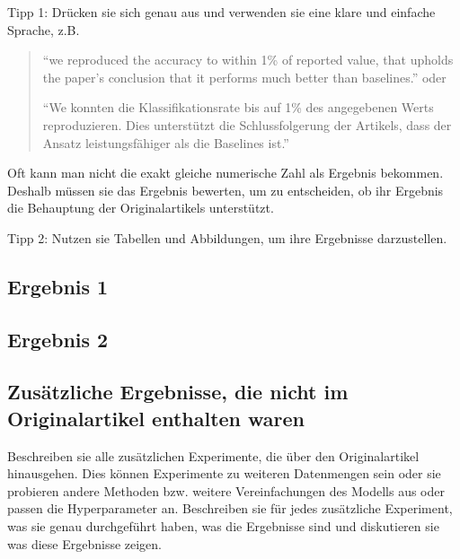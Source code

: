 \documentclass[DIV=13,fontsize=11pt]{scrartcl}
\begin{document}

Tipp 1: Drücken sie sich genau aus und verwenden sie eine klare und einfache Sprache, z.B. 
\begin{quote}
    ``we reproduced the accuracy to within 1\% of reported value, that upholds the paper's conclusion that it performs much better than baselines.'' oder

    ``We konnten die Klassifikationsrate bis auf 1\% des angegebenen Werts reproduzieren. Dies unterstützt die Schlussfolgerung der Artikels, dass der Ansatz leistungsfähiger als die Baselines ist.''
\end{quote}
Oft kann man nicht die exakt gleiche numerische Zahl als Ergebnis bekommen. Deshalb müssen sie das Ergebnis bewerten, um zu entscheiden, ob ihr Ergebnis die Behauptung der Originalartikels unterstützt.

Tipp 2: Nutzen sie Tabellen und Abbildungen, um ihre Ergebnisse darzustellen. 


\subsection{Ergebnis 1}

\subsection{Ergebnis 2}

\subsection{Zusätzliche Ergebnisse, die nicht im Originalartikel enthalten waren}
Beschreiben sie alle zusätzlichen Experimente, die über den Originalartikel hinausgehen.
Dies können Experimente zu weiteren Datenmengen sein oder sie probieren andere Methoden bzw. weitere Vereinfachungen des Modells aus oder passen die Hyperparameter an.
Beschreiben sie für jedes zusätzliche Experiment, was sie genau durchgeführt haben, was die Ergebnisse sind und diskutieren sie was diese Ergebnisse zeigen. 
\end{document}
